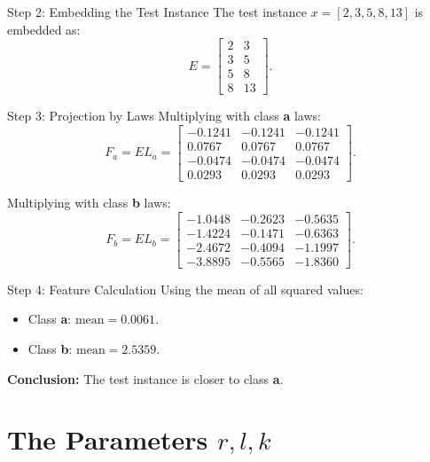 \documentclass{beamer}
\begin{document}
\begin{frame}{Step 2: Embedding the Test Instance}
  The test instance \( x = [2, 3, 5, 8, 13] \) is embedded as:
  \begin{equation}
    E = \begin{bmatrix} 2 & 3 \\ 3 & 5 \\ 5 & 8 \\ 8 & 13 \end{bmatrix}.
  \end{equation}
\end{frame}

\begin{frame}{Step 3: Projection by Laws}
  Multiplying with class \textbf{a} laws:
  \begin{equation}
    F_a = E L_a = \begin{bmatrix} -0.1241 & -0.1241 & -0.1241 \\ 0.0767 & 0.0767 & 0.0767 \\ -0.0474 & -0.0474 & -0.0474 \\ 0.0293 & 0.0293 & 0.0293 \end{bmatrix}.
  \end{equation}

  Multiplying with class \textbf{b} laws:
  \begin{equation}
    F_b = E L_b = \begin{bmatrix} -1.0448 & -0.2623 & -0.5635 \\ -1.4224 & -0.1471 & -0.6363 \\ -2.4672 & -0.4094 & -1.1997 \\ -3.8895 & -0.5565 & -1.8360 \end{bmatrix}.
  \end{equation}
\end{frame}

\begin{frame}{Step 4: Feature Calculation}
  Using the mean of all squared values:
  \begin{itemize}
    \item Class \textbf{a}: \( \text{mean} = 0.0061 \).
    \item Class \textbf{b}: \( \text{mean} = 2.5359 \).
  \end{itemize}

  \textbf{Conclusion:} The test instance is closer to class \textbf{a}.
\end{frame}

\section{The Parameters \( r, l, k \)}
\end{document}
